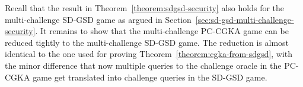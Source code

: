 Recall that the result in Theorem~\ref{theorem:sdgsd-security} also holds for the multi-challenge SD-GSD game as argued in Section~\ref{sec:sd-gsd-multi-challenge-security}. It remains to show that the multi-challenge PC-CGKA game can be reduced tightly to the multi-challenge SD-GSD game. The reduction is almost identical to the one used for proving Theorem~\ref{theorem:cgka-from-sdgsd}, with the minor difference that now multiple queries to the challenge oracle in the PC-CGKA game get translated into challenge queries in the SD-GSD game.
